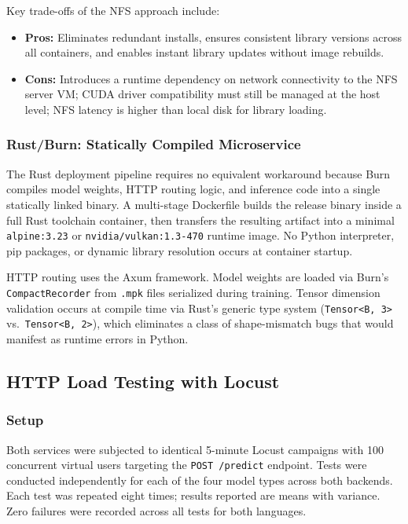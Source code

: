 \documentclass{ieeeaccess}
\begin{document}
Key trade-offs of the NFS approach include:
\begin{itemize}
    \item \textbf{Pros:} Eliminates redundant installs, ensures consistent library versions across all containers, and enables instant library updates without image rebuilds.
    \item \textbf{Cons:} Introduces a runtime dependency on network connectivity to the NFS server VM; CUDA driver compatibility must still be managed at the host level; NFS latency is higher than local disk for library loading.
\end{itemize}

\subsubsection{Rust/Burn: Statically Compiled Microservice}

The Rust deployment pipeline requires no equivalent workaround because Burn compiles model weights, HTTP routing logic, and inference code into a single statically linked binary. A multi-stage Dockerfile builds the release binary inside a full Rust toolchain container, then transfers the resulting artifact into a minimal \texttt{alpine:3.23} or \texttt{nvidia/vulkan:1.3-470} runtime image. No Python interpreter, pip packages, or dynamic library resolution occurs at container startup.

HTTP routing uses the Axum framework. Model weights are loaded via Burn's \texttt{CompactRecorder} from \texttt{.mpk} files serialized during training. Tensor dimension validation occurs at compile time via Rust's generic type system (\texttt{Tensor<B,~3>} vs.\ \texttt{Tensor<B,~2>}), which eliminates a class of shape-mismatch bugs that would manifest as runtime errors in Python.

\subsection{HTTP Load Testing with Locust}

\subsubsection{Setup}

Both services were subjected to identical 5-minute Locust campaigns with 100 concurrent virtual users targeting the \texttt{POST /predict} endpoint. Tests were conducted independently for each of the four model types across both backends. Each test was repeated eight times; results reported are means with variance. Zero failures were recorded across all tests for both languages.
\end{document}
